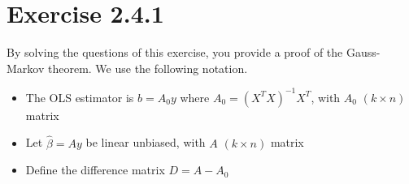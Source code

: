 \documentclass[12pt, a4paper]{article}
\begin{document}
\section*{Exercise 2.4.1}
\vspace{1em}

By solving the questions of this exercise, you provide a proof of the Gauss-Markov theorem. We use the following
notation.
\begin{itemize}
    \item The OLS estimator is $b = A_0y$ where $A_0 = (X^TX)^{-1}X^T$, with $A_0$ $(k \times n)$ matrix
    \item Let $\hat{\beta}=Ay$ be linear unbiased, with $A$ $(k \times n)$ matrix
    \item Define the difference matrix $D=A - A_0$\\
\end{itemize}
\end{document}
